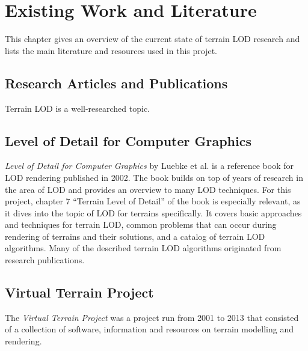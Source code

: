 \chapter{Existing Work and Literature}
This chapter gives an overview of the current state of terrain LOD research 
and lists the main literature and resources used in this projet.


\section{Research Articles and Publications}
Terrain LOD is a well-researched topic. 

\section{Level of Detail for Computer Graphics}
\textit{Level of Detail for Computer Graphics} by Luebke et al. \cite{lodfor3dgraphics} is a reference book for 
         LOD rendering published in 2002. The book builds on top of years of research in the 
         area of LOD and provides an overview to many LOD techniques. For this project,
         chapter 7 ``Terrain Level of Detail'' of the book is especially relevant, as it dives into the topic of LOD for terrains specifically.
         It covers basic approaches and techniques for terrain LOD, 
         common problems that can occur during rendering of terrains and their solutions, and a catalog of terrain LOD algorithms.
         Many of the described terrain LOD algorithms originated from research publications.

\section{Virtual Terrain Project}
The \textit{Virtual Terrain Project} \cite{vtp} was a project run from 2001 to 2013 
that consisted of a collection of software, information and resources on terrain modelling and rendering.